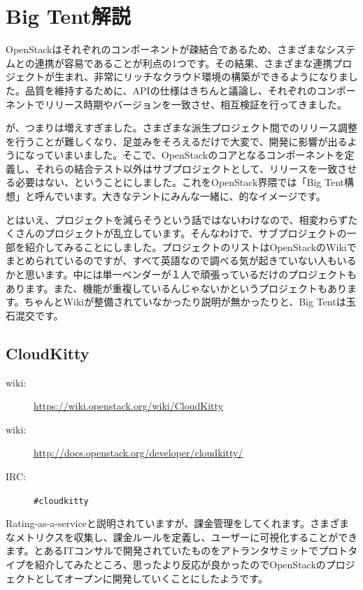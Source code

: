 \chapter{Big Tent解説}
OpenStackはそれぞれのコンポーネントが疎結合であるため、さまざまなシステムとの連携が容易であることが利点の1つです。その結果、さまざまな連携プロジェクトが生まれ、非常にリッチなクラウド環境の構築ができるようになりました。品質を維持するために、APIの仕様はきちんと議論し、それぞれのコンポーネントでリリース時期やバージョンを一致させ、相互検証を行ってきました。

が、つまりは増えすぎました。さまざまな派生プロジェクト間でのリリース調整を行うことが難しくなり、足並みをそろえるだけで大変で、開発に影響が出るようになっていまいました。そこで、OpenStackのコアとなるコンポーネントを定義し、それらの結合テスト以外はサブプロジェクトとして、リリースを一致させる必要はない、ということにしました。これをOpenStack界隈では「Big Tent構想」と呼んでいます。大きなテントにみんな一緒に、的なイメージです。

とはいえ、プロジェクトを減らそうという話ではないわけなので、相変わらずたくさんのプロジェクトが乱立しています。そんなわけで、サブプロジェクトの一部を紹介してみることにしました。プロジェクトのリストはOpenStackのWikiでまとめられているのですが、すべて英語なので調べる気が起きていない人もいるかと思います。中には単一ベンダーが１人で頑張っているだけのプロジェクトもあります。また、機能が重複しているんじゃないかというプロジェクトもあります。ちゃんとWikiが整備されていなかったり説明が無かったりと、Big Tentは玉石混交です。

\section{CloudKitty}

\begin{description}
	\item[wiki:] \url{https://wiki.openstack.org/wiki/CloudKitty}
	\item[wiki:] \url{http://docs.openstack.org/developer/cloudkitty/}
	\item[IRC:] \verb|#cloudkitty|
\end{description}

Rating-as-a-serviceと説明されていますが、課金管理をしてくれます。さまざまなメトリクスを収集し、課金ルールを定義し、ユーザーに可視化することができます。とあるITコンサルで開発されていたものをアトランタサミットでプロトタイプを紹介してみたところ、思ったより反応が良かったのでOpenStackのプロジェクトとしてオープンに開発していくことにしたようです。

